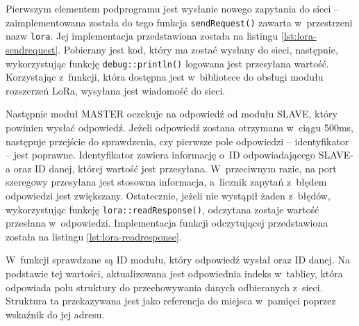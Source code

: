 

Pierwszym elementem podprogramu jest wysłanie nowego zapytania do sieci -- zaimplementowana została do tego funkcja
\texttt{sendRequest()} zawarta w~przestrzeni nazw \texttt{lora}. Jej implementacja przedstawiona została na listingu
\ref{lst:lora-sendrequest}. Pobierany jest kod, który ma zostać wysłany do sieci, następnie, wykorzystując funkcję
\texttt{debug::println()} logowana jest przesyłana wartość. Korzystając z~funkcji, która dostępna jest w~bibliotece do
obsługi modułu rozszerzeń LoRa, wysyłana jest wiadomość do sieci.



Następnie moduł MASTER oczekuje na odpowiedź od modułu SLAVE, który powinien wysłać odpowiedź. Jeżeli odpowiedź zostana
otrzymana w~ciągu 500ms, następuje przejście do sprawdzenia, czy pierwsze pole odpowiedzi -- identyfikator -- jest
poprawne. Identyfikator zawiera informację o~ID odpowiadającego SLAVE-a oraz ID danej, której wartość jest przesyłana.
W~przeciwnym razie, na port szeregowy przesyłana jest stosowna informacja, a~licznik zapytań z~błędem odpowiedzi jest
zwiększany. Ostatecznie, jeżeli nie wystąpił żaden z~błędów, wykorzystując funkcję \texttt{lora::readResponse()},
odczytana zostaje wartość przesłana w~odpowiedzi. Implementacja funkcji odczytującej przedstawiona została na listingu
\ref{lst:lora-readresponse}.



W~funkcji sprawdzane są ID modułu, który odpowiedź wysłał oraz ID danej. Na podstawie tej wartości, aktualizowana jest
odpowiednia indeks w~tablicy, która odpowiada polu struktury do przechowywania danych odbieranych z~sieci. Struktura ta
przekazywana jest jako referencja do miejsca w~pamięci poprzez wskaźnik do jej adresu.

